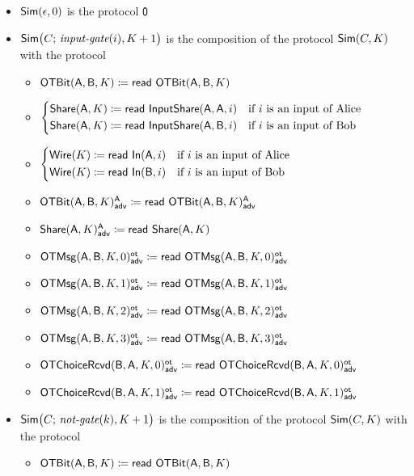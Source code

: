 \begin{itemize}
\item $\Sim(\epsilon,0)$ is the protocol $\zero$
\item $\Sim\big(C; \, \inputgate(i),K+1\big)$ is the composition of the protocol $\Sim(C,K)$ with the protocol
\begin{itemize}
\item $\OTBit(\A,\B,K) \coloneqq \read{\OTBit(\A,\B,K)}$
\item $\begin{cases*} \Share(\A,K) \coloneqq \read{\InputShare(\A,\A,i)} & \text{if $i$ is an input of Alice} \\ \Share(\A,K) \coloneqq \read{\InputShare(\A,\B,i)} & \text{if $i$ is an input of Bob} \end{cases*}$
\item $\begin{cases*} \Wire(K) \coloneqq \read{\In(\A,i)} & \text{if $i$ is an input of Alice} \\ \Wire(K) \coloneqq \read{\In(\B,i)} & \text{if $i$ is an input of Bob} \end{cases*}$\medskip
\item {\color{blue} $\LeakOTBit(\A,\B,K)^\A_\adv \coloneqq \read{\LeakOTBit(\A,\B,K)^\A_\adv}$}
\item {\color{blue} $\LeakShare(\A,K)^\A_\adv \coloneqq \read{\Share(\A,K)}$}\medskip
\item {\color{blue} $\LeakOTMsg(\A,\B,K,0)^\ot_\adv \coloneqq \read{\LeakOTMsg(\A,\B,K,0)^\ot_\adv}$}
\item {\color{blue} $\LeakOTMsg(\A,\B,K,1)^\ot_\adv \coloneqq \read{\LeakOTMsg(\A,\B,K,1)^\ot_\adv}$}
\item {\color{blue} $\LeakOTMsg(\A,\B,K,2)^\ot_\adv \coloneqq \read{\LeakOTMsg(\A,\B,K,2)^\ot_\adv}$}
\item {\color{blue} $\LeakOTMsg(\A,\B,K,3)^\ot_\adv \coloneqq \read{\LeakOTMsg(\A,\B,K,3)^\ot_\adv}$}\medskip
\item {\color{blue} $\LeakOTChoiceRcvd(\B,\A,K,0)^\ot_\adv \coloneqq \read{\LeakOTChoiceRcvd(\B,\A,K,0)^\ot_\adv}$}
\item {\color{blue} $\LeakOTChoiceRcvd(\B,\A,K,1)^\ot_\adv \coloneqq \read{\LeakOTChoiceRcvd(\B,\A,K,1)^\ot_\adv}$}
\end{itemize}
\item $\Sim\big(C; \, \notgate(k),K+1\big)$ is the composition of the protocol $\Sim(C,K)$ with the protocol
\begin{itemize}
\item $\OTBit(\A,\B,K) \coloneqq \read{\OTBit(\A,\B,K)}$

\end{itemize}
\end{itemize}
